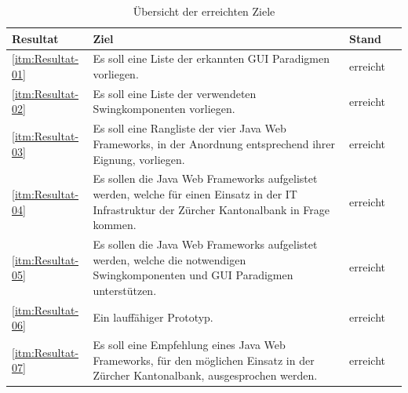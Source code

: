   \begin{table}[p]
    \sffamily 
    \begin{center}
      \begin{tabular}{lp{9cm}ll}
        \toprule
        \textbf{Resultat} & \textbf{Ziel} & \textbf{Stand} \\
        \midrule
        \ref{itm:Resultat-01} &
          Es soll eine Liste der erkannten GUI Paradigmen vorliegen. &
          erreicht\\
        \ref{itm:Resultat-02} &
          Es soll eine Liste der verwendeten Swingkomponenten vorliegen. &
          erreicht\\
        \ref{itm:Resultat-03} &
          Es soll eine Rangliste der vier Java Web Frameworks, in der Anordnung
          entsprechend ihrer Eignung, vorliegen. &
          erreicht\\
        \ref{itm:Resultat-04} &
          Es sollen die Java Web Frameworks aufgelistet werden, welche für
          einen Einsatz in der IT Infrastruktur der Zürcher Kantonalbank in
          Frage kommen. &
          erreicht\\
        \ref{itm:Resultat-05} &
          Es sollen die Java Web Frameworks aufgelistet werden, welche die
          notwendigen Swingkomponenten und GUI Paradigmen unterstützen. &
          erreicht\\
        \ref{itm:Resultat-06} &
          Ein lauffähiger Prototyp. &
          erreicht\\
        \ref{itm:Resultat-07} &
          Es soll eine Empfehlung eines Java Web Frameworks, für den möglichen
          Einsatz in der Zürcher Kantonalbank, ausgesprochen werden. &
          erreicht\\
        \bottomrule
      \end{tabular}
      \caption{Übersicht der erreichten Ziele}
      \label{tab:erreichteZiele}
    \end{center}
  \end{table}